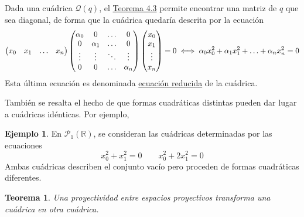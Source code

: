 \documentclass[12pt]{report}
\newtheorem{theorem}{Teorema}[chapter]
\theoremstyle{definition}
\theoremstyle{definition}
\newtheorem{example}{Ejemplo}[chapter]
\theoremstyle{remark}
\newcommand{\R}{\mathbb R}
\begin{document}
Dada una cuádrica $\mathcal{Q}(q)$, el \hyperref[teo4.3.]{\color{blue}Teorema 4.3} permite encontrar una matriz de $q$ que sea diagonal, de forma que la cuádrica quedaría descrita por la ecuación
\[\begin{pmatrix*}
    x_0 & x_1 & \mathellipsis & x_n
\end{pmatrix*}\begin{pmatrix*}
    \alpha_0 & 0 & \mathellipsis & 0 \\
    0 & \alpha_1 & \mathellipsis & 0 \\
    \vdots & \vdots & \ddots & \vdots \\
    0 & 0 & \mathellipsis & \alpha_n
\end{pmatrix*} \begin{pmatrix*}
    x_0 \\
    x_1 \\
    \vdots \\
    x_n
\end{pmatrix*} = 0 \iff
\alpha_0x_0^2+\alpha_1x_1^2+\mathellipsis+\alpha_nx_n^2 = 0
\]
Esta última ecuación es denominada \ul{ecuación reducida} de la cuádrica.

\vspace{2mm}
También se resalta el hecho de que formas cuadráticas distintas pueden dar lugar a cuádricas idénticas. Por ejemplo,

\begin{example}
En $\mathcal{P}_1(\R)$, se consideran las cuádricas determinadas por las ecuaciones
\[x_0^2+x_1^2=0 \qquad x_0^2 + 2x_1^2 =0\]
Ambas cuádricas describen el conjunto vacío pero proceden de formas cuadráticas diferentes.
\end{example} 

\begin{theorem}
\label{teo5.1.}
    Una proyectividad entre espacios proyectivos transforma una cuádrica en otra cuádrica.
\end{theorem}
\end{document}
